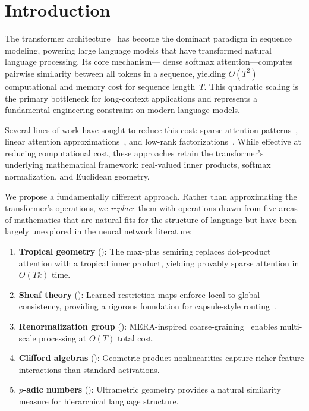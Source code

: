 \documentclass[11pt,a4paper]{article}
\begin{document}
\section{Introduction}
\label{sec:intro}

The transformer architecture~\citep{vaswani2017attention} has become the
dominant paradigm in sequence modeling, powering large language models
that have transformed natural language processing.  Its core mechanism---
dense softmax attention---computes pairwise similarity between all tokens
in a sequence, yielding $O(T^2)$ computational and memory cost for
sequence length~$T$.  This quadratic scaling is the primary bottleneck
for long-context applications and represents a fundamental engineering
constraint on modern language models.

Several lines of work have sought to reduce this cost: sparse
attention patterns~\citep{child2019generating, beltagy2020longformer,
zaheer2020bigbird}, linear attention
approximations~\citep{katharopoulos2020transformers, choromanski2021rethinking},
and low-rank factorizations~\citep{wang2020linformer}.  While
effective at reducing computational cost, these approaches retain the
transformer's underlying mathematical framework: real-valued inner
products, softmax normalization, and Euclidean geometry.

We propose a fundamentally different approach.  Rather than
approximating the transformer's operations, we \emph{replace} them
with operations drawn from five areas of mathematics that are natural
fits for the structure of language but have been largely unexplored in
the neural network literature:

\begin{enumerate}[leftmargin=*,nosep]
\item \textbf{Tropical geometry} (): The max-plus
  semiring replaces dot-product attention with a tropical inner product,
  yielding provably sparse attention in $O(Tk)$ time.
\item \textbf{Sheaf theory} (): Learned restriction
  maps enforce local-to-global consistency, providing a rigorous
  foundation for capsule-style routing~\citep{sabour2017dynamic}.
\item \textbf{Renormalization group} (): MERA-inspired
  coarse-graining~\citep{vidal2007entanglement} enables multi-scale
  processing at $O(T)$ total cost.
\item \textbf{Clifford algebras} (): Geometric
  product nonlinearities capture richer feature interactions than
  standard activations.
\item \textbf{$p$-adic numbers} (): Ultrametric
  geometry provides a natural similarity measure for hierarchical
  language structure.
\end{enumerate}
\end{document}
